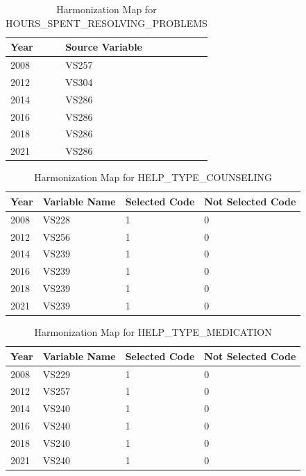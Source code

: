 \begin{table}[ht]
\centering
\caption{Harmonization Map for HOURS\_SPENT\_RESOLVING\_PROBLEMS}
\label{tab:map_hours_spent}
\begin{tabular}{ll}
\toprule
\textbf{Year} & \textbf{Source Variable} \\
\midrule
2008 & VS257 \\
2012 & VS304 \\
2014 & VS286 \\
2016 & VS286 \\
2018 & VS286 \\
2021 & VS286 \\
\bottomrule
\end{tabular}
\end{table}

\begin{table}[ht]
\centering
\caption{Harmonization Map for HELP\_TYPE\_COUNSELING}
\label{tab:map_counseling}
\begin{tabular}{llll}
\toprule
\textbf{Year} & \textbf{Variable Name} & \textbf{Selected Code} & \textbf{Not Selected Code} \\
\midrule
2008 & VS228 & 1 & 0 \\
2012 & VS256 & 1 & 0 \\
2014 & VS239 & 1 & 0 \\
2016 & VS239 & 1 & 0 \\
2018 & VS239 & 1 & 0 \\
2021 & VS239 & 1 & 0 \\
\bottomrule
\end{tabular}
\end{table}

\begin{table}[ht]
\centering
\caption{Harmonization Map for HELP\_TYPE\_MEDICATION}
\label{tab:map_medication}
\begin{tabular}{llll}
\toprule
\textbf{Year} & \textbf{Variable Name} & \textbf{Selected Code} & \textbf{Not Selected Code} \\
\midrule
2008 & VS229 & 1 & 0 \\
2012 & VS257 & 1 & 0 \\
2014 & VS240 & 1 & 0 \\
2016 & VS240 & 1 & 0 \\
2018 & VS240 & 1 & 0 \\
2021 & VS240 & 1 & 0 \\
\bottomrule
\end{tabular}
\end{table}


